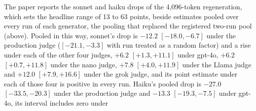 The paper reports the sonnet and haiku drops of the 4,096-token
regeneration, which sets the headline range of 13 to 63 points, beside
estimates pooled over every run of each generator, the pooling that replaced
the registered two-run pool (above).
Pooled in this way, sonnet's drop is $-12.2$ $[-18.0, -6.7]$ under the
production judge ($[-21.1, -3.3]$ with run treated as a random factor) and a
rise under each of the other four judges, $+6.2$ $[+1.3, +11.1]$ under gpt-4o, $+6.2$ $[+0.7, +11.8]$
under the nano judge, $+7.8$ $[+4.0, +11.9]$ under the Llama judge and
$+12.0$ $[+7.9, +16.6]$ under the grok judge, and its point estimate under
each of those four is positive in every run.
Haiku's pooled drop is $-27.0$ $[-33.5, -20.3]$ under the production judge
and $-13.3$ $[-19.3, -7.5]$ under gpt-4o, its interval includes zero under
